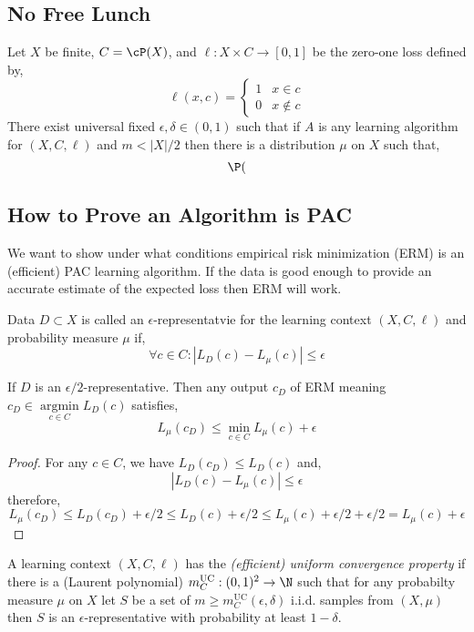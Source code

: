 \documentclass[12pt]{article}
\DeclareMathOperator{\argmin}{\mathrm{argmin}}
\begin{document}
\subsection{No Free Lunch}

\begin{theorem}
Let $X$ be finite, $C = \cP(X)$, and $\ell : X \times C \to [0,1]$ be the zero-one loss defined by,
\[ \ell(x, c) = 
\begin{cases}
1 & x \in c
\\
0 & x \notin c
\end{cases} \]
There exist universal fixed $\epsilon, \delta \in (0,1)$ such that if $A$ is any learning algorithm for $(X, C, \ell)$ and $m < |X|/2$ then there is a distribution $\mu$ on $X$ such that,
\[ \P( \]
\end{theorem}

\subsection{How to Prove an Algorithm is PAC}


\begin{rmk}
We want to show under what conditions empirical risk minimization (ERM) is an (efficient) PAC learning algorithm. If the data is good enough to provide an accurate estimate of the expected loss then ERM will work.
\end{rmk}

\begin{defn}
Data $D \subset X$ is called an $\epsilon$-representatvie for the learning context $(X, C, \ell)$ and probability measure $\mu$ if,
\[ \forall c \in C : |L_D(c) - L_\mu(c)| \le \epsilon \]
\end{defn}

\begin{lemma}
If $D$ is an $\epsilon/2$-representative. Then any output $c_D$ of ERM meaning $c_D \in \argmin\limits_{c \in C} L_D(c)$ satisfies,
\[ L_\mu(c_D) \le \min_{c \in C} L_\mu(c) + \epsilon \]
\end{lemma}

\begin{proof}
For any $c \in C$, we have $L_D(c_D) \le L_D(c)$  and,
\[ |L_D(c) - L_\mu(c)| \le \epsilon \]
therefore,
\[ L_\mu(c_D) \le L_D(c_D) + \epsilon/2 \le L_D(c) + \epsilon/2 \le L_\mu(c) + \epsilon/2 + \epsilon/2 = L_\mu(c) + \epsilon \]
\end{proof}

\begin{defn}
A learning context $(X, C, \ell)$ has the \textit{(efficient) uniform convergence property} if there is a (Laurent polynomial) $m^{\text{UC}}_C : (0,1)^2 \to \N$ such that for any probabilty measure $\mu$ on $X$ let $S$ be a set of $m \ge m_C^{\text{UC}}(\epsilon, \delta)$ i.i.d. samples from $(X, \mu)$ then $S$ is an $\epsilon$-representative with probability at least $1 - \delta$.
\end{defn}
\end{document}
